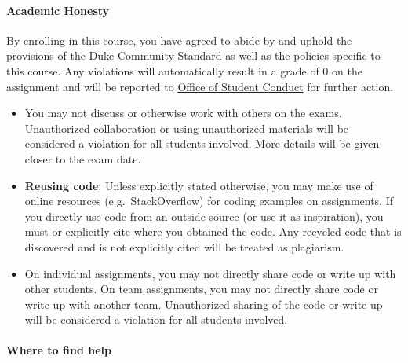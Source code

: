 \documentclass[]{article}
\providecommand{\tightlist}{%
  \setlength{\itemsep}{0pt}\setlength{\parskip}{0pt}}
\let\oldparagraph\paragraph
\renewcommand{\paragraph}[1]{\oldparagraph{#1}\mbox{}}
\begin{document}
\hypertarget{academic-honesty}{%
\paragraph{Academic Honesty}\label{academic-honesty}}

By enrolling in this course, you have agreed to abide by and uphold the
provisions of the
\href{https://studentaffairs.duke.edu/conduct/about-us/duke-community-standard}{Duke
Community Standard} as well as the policies specific to this course. Any
violations will automatically result in a grade of 0 on the assignment
and will be reported to
\href{https://studentaffairs.duke.edu/conduct}{Office of Student
Conduct} for further action.

\begin{itemize}
\tightlist
\item
  You may not discuss or otherwise work with others on the exams.
  Unauthorized collaboration or using unauthorized materials will be
  considered a violation for all students involved. More details will be
  given closer to the exam date.
\item
  \textbf{Reusing code}: Unless explicitly stated otherwise, you may
  make use of online resources (e.g.~StackOverflow) for coding examples
  on assignments. If you directly use code from an outside source (or
  use it as inspiration), you must or explicitly cite where you obtained
  the code. Any recycled code that is discovered and is not explicitly
  cited will be treated as plagiarism.
\item
  On individual assignments, you may not directly share code or write up
  with other students. On team assignments, you may not directly share
  code or write up with another team. Unauthorized sharing of the code
  or write up will be considered a violation for all students involved. 
\end{itemize}

\hypertarget{where-to-find-help}{%
\paragraph{Where to find help}\label{where-to-find-help}}
\end{document}
